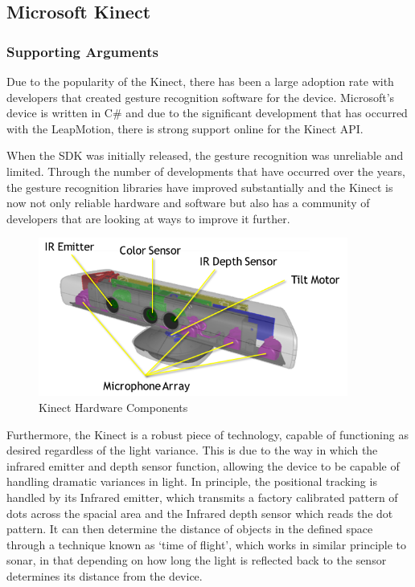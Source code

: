 \documentclass{l4proj}
\begin{document}
\subsection{Microsoft Kinect}
\vspace{-3mm}
\subsubsection{Supporting Arguments}
\vspace{-3mm}
Due to the popularity of the Kinect, there has been a large adoption rate with developers that created gesture recognition software for the device. Microsoft's device is written in C\# and due to the significant development that has occurred with the LeapMotion, there is strong support online for the Kinect API. 

When the SDK was initially released, the gesture recognition was unreliable and limited. Through the number of developments that have occurred over the years, the gesture recognition libraries have improved substantially and the Kinect is now not only reliable hardware and software but also has a community of developers that are looking at ways to improve it further.
\begin{figure}[h!]
\centering
\includegraphics[width=4in]{images/KinectIR.png}
\caption{Kinect Hardware Components}
\label{fig:kinecthard}
\end{figure}

Furthermore, the Kinect is a robust piece of technology, capable of functioning as desired regardless of the light variance. This is due to the way in which the infrared emitter and depth sensor function, allowing the device to be capable of handling dramatic variances in light. In principle, the positional tracking is handled by its Infrared emitter, which transmits a factory calibrated pattern of dots across the spacial area and the Infrared depth sensor which reads the dot pattern. It can then determine the distance of objects in the defined space through a technique known as `time of flight', which works in similar principle to sonar, in that depending on how long the light is reflected back to the sensor determines its distance from the device. 
\end{document}
